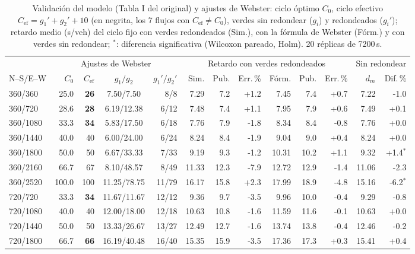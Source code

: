 \begin{table}[!t]
\caption{Validación del modelo (Tabla I del original) y ajustes de Webster: ciclo óptimo $C_0$, ciclo efectivo $C_{\mathrm{ef}}=g_1'+g_2'+10$ (en negrita, los 7 flujos con $C_{\mathrm{ef}}\ne C_0$), verdes sin redondear ($g_i$) y redondeados ($g_i'$); retardo medio (s/veh) del ciclo fijo con verdes redondeados (Sim.), con la fórmula de Webster (Fórm.) y con verdes sin redondear; $^{*}$: diferencia significativa (Wilcoxon pareado, Holm). 20 réplicas de 7200\,s.}
\label{tab:tablaI}
\centering
\scriptsize
\setlength{\tabcolsep}{3pt}
\begin{tabular}{@{}lrrcrrrrrrrrr@{}}
\toprule
 & \multicolumn{4}{c}{Ajustes de Webster} & \multicolumn{6}{c}{Retardo con verdes redondeados} & \multicolumn{2}{c}{Sin redondear} \\
\cmidrule(lr){2-5}\cmidrule(lr){6-11}\cmidrule(lr){12-13}
N--S/E--W & $C_0$ & $C_{\mathrm{ef}}$ & $g_1/g_2$ & $g_1'/g_2'$ & Sim. & Pub. & Err.\,\% & Fórm. & Pub. & Err.\,\% & $d_m$ & Dif.\,\% \\
\midrule
360/360 & 25.0 & \textbf{26} & 7.50/7.50 & 8/8 & 7.29 & 7.2 & +1.2 & 7.45 & 7.4 & +0.7 & 7.22 & -1.0 \\
360/720 & 28.6 & \textbf{28} & 6.19/12.38 & 6/12 & 7.48 & 7.4 & +1.1 & 7.95 & 7.9 & +0.6 & 7.49 & +0.1 \\
360/1080 & 33.3 & \textbf{34} & 5.83/17.50 & 6/18 & 7.76 & 7.9 & -1.8 & 8.34 & 8.4 & -0.8 & 7.76 & +0.0 \\
360/1440 & 40.0 & {40} & 6.00/24.00 & 6/24 & 8.24 & 8.4 & -1.9 & 9.04 & 9.0 & +0.4 & 8.24 & +0.0 \\
360/1800 & 50.0 & {50} & 6.67/33.33 & 7/33 & 9.19 & 9.3 & -1.2 & 10.31 & 10.2 & +1.1 & 9.32 & +1.4$^{*}$ \\
360/2160 & 66.7 & {67} & 8.10/48.57 & 8/49 & 11.33 & 12.3 & -7.9 & 12.72 & 12.9 & -1.4 & 11.06 & -2.3 \\
360/2520 & 100.0 & {100} & 11.25/78.75 & 11/79 & 16.17 & 15.8 & +2.3 & 17.99 & 18.9 & -4.8 & 15.16 & -6.2$^{*}$ \\
720/720 & 33.3 & \textbf{34} & 11.67/11.67 & 12/12 & 9.36 & 9.7 & -3.5 & 9.96 & 10.0 & -0.4 & 9.29 & -0.8 \\
720/1080 & 40.0 & {40} & 12.00/18.00 & 12/18 & 10.63 & 10.8 & -1.6 & 11.59 & 11.6 & -0.1 & 10.63 & +0.0 \\
720/1440 & 50.0 & {50} & 13.33/26.67 & 13/27 & 12.49 & 12.7 & -1.6 & 13.74 & 13.8 & -0.4 & 12.46 & -0.2 \\
720/1800 & 66.7 & \textbf{66} & 16.19/40.48 & 16/40 & 15.35 & 15.9 & -3.5 & 17.36 & 17.3 & +0.3 & 15.41 & +0.4 \\

\end{tabular}
\end{table}
